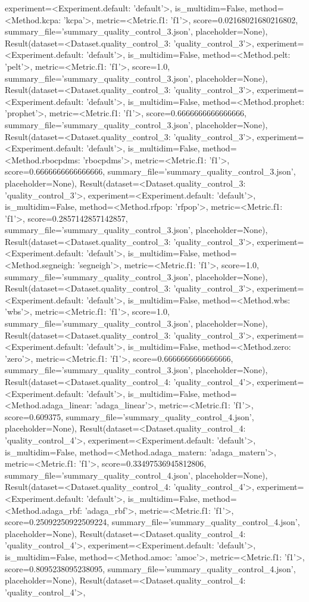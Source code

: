 experiment=<Experiment.default: 'default'>, is_multidim=False, method=<Method.kcpa: 'kcpa'>, metric=<Metric.f1: 'f1'>, score=0.02168021680216802, summary_file='summary_quality_control_3.json', placeholder=None), Result(dataset=<Dataset.quality_control_3: 'quality_control_3'>, experiment=<Experiment.default: 'default'>, is_multidim=False, method=<Method.pelt: 'pelt'>, metric=<Metric.f1: 'f1'>, score=1.0, summary_file='summary_quality_control_3.json', placeholder=None), Result(dataset=<Dataset.quality_control_3: 'quality_control_3'>, experiment=<Experiment.default: 'default'>, is_multidim=False, method=<Method.prophet: 'prophet'>, metric=<Metric.f1: 'f1'>, score=0.6666666666666666, summary_file='summary_quality_control_3.json', placeholder=None), Result(dataset=<Dataset.quality_control_3: 'quality_control_3'>, experiment=<Experiment.default: 'default'>, is_multidim=False, method=<Method.rbocpdms: 'rbocpdms'>, metric=<Metric.f1: 'f1'>, score=0.6666666666666666, summary_file='summary_quality_control_3.json', placeholder=None), Result(dataset=<Dataset.quality_control_3: 'quality_control_3'>, experiment=<Experiment.default: 'default'>, is_multidim=False, method=<Method.rfpop: 'rfpop'>, metric=<Metric.f1: 'f1'>, score=0.2857142857142857, summary_file='summary_quality_control_3.json', placeholder=None), Result(dataset=<Dataset.quality_control_3: 'quality_control_3'>, experiment=<Experiment.default: 'default'>, is_multidim=False, method=<Method.segneigh: 'segneigh'>, metric=<Metric.f1: 'f1'>, score=1.0, summary_file='summary_quality_control_3.json', placeholder=None), Result(dataset=<Dataset.quality_control_3: 'quality_control_3'>, experiment=<Experiment.default: 'default'>, is_multidim=False, method=<Method.wbs: 'wbs'>, metric=<Metric.f1: 'f1'>, score=1.0, summary_file='summary_quality_control_3.json', placeholder=None), Result(dataset=<Dataset.quality_control_3: 'quality_control_3'>, experiment=<Experiment.default: 'default'>, is_multidim=False, method=<Method.zero: 'zero'>, metric=<Metric.f1: 'f1'>, score=0.6666666666666666, summary_file='summary_quality_control_3.json', placeholder=None), Result(dataset=<Dataset.quality_control_4: 'quality_control_4'>, experiment=<Experiment.default: 'default'>, is_multidim=False, method=<Method.adaga_linear: 'adaga_linear'>, metric=<Metric.f1: 'f1'>, score=0.609375, summary_file='summary_quality_control_4.json', placeholder=None), Result(dataset=<Dataset.quality_control_4: 'quality_control_4'>, experiment=<Experiment.default: 'default'>, is_multidim=False, method=<Method.adaga_matern: 'adaga_matern'>, metric=<Metric.f1: 'f1'>, score=0.33497536945812806, summary_file='summary_quality_control_4.json', placeholder=None), Result(dataset=<Dataset.quality_control_4: 'quality_control_4'>, experiment=<Experiment.default: 'default'>, is_multidim=False, method=<Method.adaga_rbf: 'adaga_rbf'>, metric=<Metric.f1: 'f1'>, score=0.25092250922509224, summary_file='summary_quality_control_4.json', placeholder=None), Result(dataset=<Dataset.quality_control_4: 'quality_control_4'>, experiment=<Experiment.default: 'default'>, is_multidim=False, method=<Method.amoc: 'amoc'>, metric=<Metric.f1: 'f1'>, score=0.8095238095238095, summary_file='summary_quality_control_4.json', placeholder=None), Result(dataset=<Dataset.quality_control_4: 'quality_control_4'>, 